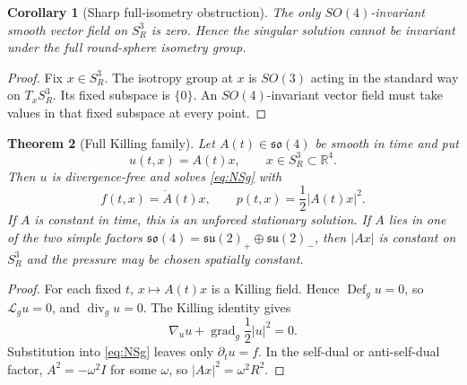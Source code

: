 \documentclass[aps,prd,reprint,superscriptaddress,nofootinbib,floatfix]{revtex4-2}
\newtheorem{theorem}{Theorem}
\newtheorem{corollary}[theorem]{Corollary}
\theoremstyle{definition}
\theoremstyle{remark}
\newcommand{\RR}{\mathbb{R}}
\newcommand{\Def}{\operatorname{Def}}
\newcommand{\divg}{\operatorname{div}_g}
\newcommand{\gradg}{\operatorname{grad}_g}
\newcommand{\cL}{\mathcal{L}}
\begin{document}
\begin{corollary}[Sharp full-isometry obstruction]\label{cor:SO4zero}
	The only $SO(4)$-invariant smooth vector field on $S^3_R$ is zero.  Hence the singular solution cannot be invariant under the full round-sphere isometry group.
\end{corollary}

\begin{proof}
	Fix $x\in S^3_R$.  The isotropy group at $x$ is $SO(3)$ acting in the standard way on $T_xS^3_R$.  Its fixed subspace is $\{0\}$.  An $SO(4)$-invariant vector field must take values in that fixed subspace at every point.
\end{proof}

\begin{theorem}[Full Killing family]\label{thm:KillingFamily}
	Let $A(t)\in\mathfrak{so}(4)$ be smooth in time and put
	\begin{equation}
		u(t,x)=A(t)x,\qquad x\in S^3_R\subset\RR^4 .
	\end{equation}
	Then $u$ is divergence-free and solves \eqref{eq:NSg} with
	\begin{equation}
		f(t,x)=\dot A(t)x,\qquad p(t,x)=\frac12 |A(t)x|^2 .
	\end{equation}
	If $A$ is constant in time, this is an unforced stationary solution.  If $A$ lies in one of the two simple factors
	$\mathfrak{so}(4)=\mathfrak{su}(2)_+\oplus\mathfrak{su}(2)_-$, then $|A x|$ is constant on $S^3_R$ and the pressure may be chosen spatially constant.
\end{theorem}

\begin{proof}
	For each fixed $t$, $x\mapsto A(t)x$ is a Killing field.  Hence $\Def_g u=0$, so $\cL_g u=0$, and $\divg u=0$.  The Killing identity gives
	\[
		\nabla_u u+\gradg\frac12|u|^2=0.
	\]
	Substitution into \eqref{eq:NSg} leaves only $\partial_tu=f$.  In the self-dual or anti-self-dual factor, $A^2=-\omega^2 I$ for some $\omega$, so $|Ax|^2=\omega^2R^2$.
\end{proof}
\end{document}
